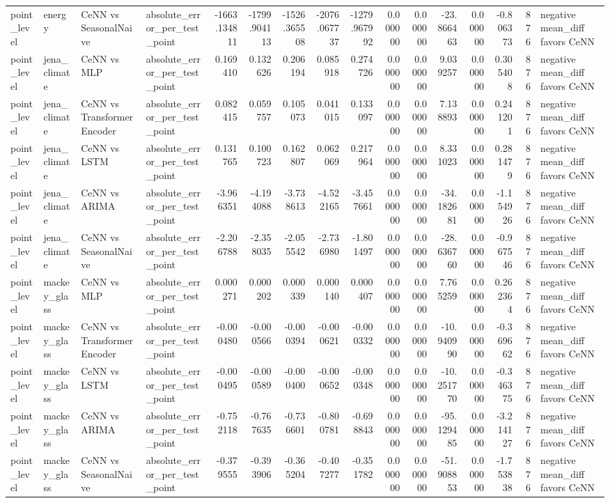 \begin{tabular}{llllrrrrrrrrrrrl}
point_level & energy & CeNN vs SeasonalNaive & absolute_error_per_test_point & -1663.134811 & -1799.904113 & -1526.365508 & -2076.067737 & -1279.967992 & 0.000000 & 0.000000 & -23.866463 & 0.000000 & -0.806373 & 876 & negative mean_diff favors CeNN \\
point_level & jena_climate & CeNN vs MLP & absolute_error_per_test_point & 0.169410 & 0.132626 & 0.206194 & 0.085918 & 0.274726 & 0.000000 & 0.000000 & 9.039257 & 0.000000 & 0.305408 & 876 & negative mean_diff favors CeNN \\
point_level & jena_climate & CeNN vs TransformerEncoder & absolute_error_per_test_point & 0.082415 & 0.059757 & 0.105073 & 0.041015 & 0.133097 & 0.000000 & 0.000000 & 7.138893 & 0.000000 & 0.241201 & 876 & negative mean_diff favors CeNN \\
point_level & jena_climate & CeNN vs LSTM & absolute_error_per_test_point & 0.131765 & 0.100723 & 0.162807 & 0.062069 & 0.217964 & 0.000000 & 0.000000 & 8.331023 & 0.000000 & 0.281479 & 876 & negative mean_diff favors CeNN \\
point_level & jena_climate & CeNN vs ARIMA & absolute_error_per_test_point & -3.966351 & -4.194088 & -3.738613 & -4.522165 & -3.457661 & 0.000000 & 0.000000 & -34.182681 & 0.000000 & -1.154926 & 876 & negative mean_diff favors CeNN \\
point_level & jena_climate & CeNN vs SeasonalNaive & absolute_error_per_test_point & -2.206788 & -2.358035 & -2.055542 & -2.736980 & -1.801497 & 0.000000 & 0.000000 & -28.636760 & 0.000000 & -0.967546 & 876 & negative mean_diff favors CeNN \\
point_level & mackey_glass & CeNN vs MLP & absolute_error_per_test_point & 0.000271 & 0.000202 & 0.000339 & 0.000140 & 0.000407 & 0.000000 & 0.000000 & 7.765259 & 0.000000 & 0.262364 & 876 & negative mean_diff favors CeNN \\
point_level & mackey_glass & CeNN vs TransformerEncoder & absolute_error_per_test_point & -0.000480 & -0.000566 & -0.000394 & -0.000621 & -0.000332 & 0.000000 & 0.000000 & -10.940990 & 0.000000 & -0.369662 & 876 & negative mean_diff favors CeNN \\
point_level & mackey_glass & CeNN vs LSTM & absolute_error_per_test_point & -0.000495 & -0.000589 & -0.000400 & -0.000652 & -0.000348 & 0.000000 & 0.000000 & -10.251770 & 0.000000 & -0.346375 & 876 & negative mean_diff favors CeNN \\
point_level & mackey_glass & CeNN vs ARIMA & absolute_error_per_test_point & -0.752118 & -0.767635 & -0.736601 & -0.800781 & -0.698843 & 0.000000 & 0.000000 & -95.129485 & 0.000000 & -3.214127 & 876 & negative mean_diff favors CeNN \\
point_level & mackey_glass & CeNN vs SeasonalNaive & absolute_error_per_test_point & -0.379555 & -0.393906 & -0.365204 & -0.407277 & -0.351782 & 0.000000 & 0.000000 & -51.908853 & 0.000000 & -1.753838 & 876 & negative mean_diff favors CeNN \\
\bottomrule
\end{tabular}

